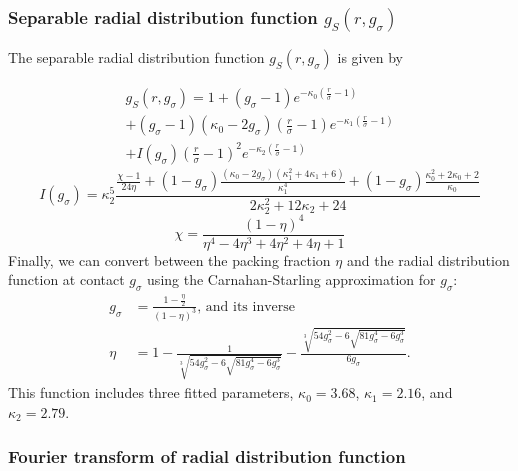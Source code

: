 \documentclass[letterpaper,twocolumn,amsmath,amssymb,pre,aps,10pt]{revtex4-1}
\begin{document}
\subsubsection{Separable radial distribution function
  $g_S(r,g_\sigma)$}

The separable radial distribution function $g_S(r,g_\sigma)$ is given
by
\newcommand\kappaO{\kappa_0}
\newcommand\kappaI{\kappa_1}
\newcommand\kappaZ{\kappa_2}
\newcommand\kappazero{3.68}
\newcommand\kappaone{2.16}
\newcommand\kappatwo{2.79}

\begin{multline}\label{eq:gs}
  g_S(r,g_\sigma) = 1 + (g_\sigma-1) e^{-\kappaO \left(\frac{r}{\sigma}-1\right)} \\
  + (g_\sigma -1)(\kappaO - 2g_\sigma)  \left(\frac{r}{\sigma}-1\right)e^{-\kappaI  \left(\frac{r}{\sigma}-1\right)} \\
  + I(g_\sigma)  \left(\frac{r}{\sigma}-1\right)^2e^{-\kappaZ  \left(\frac{r}{\sigma}-1\right)}
\end{multline}
\begin{equation}
  I(g_\sigma) = \kappaZ^5 \frac{
    \frac{\chi-1}{24\eta} + (1-g_\sigma) \frac{(\kappaO-2
      g_\sigma)(\kappaI^2 + 4 \kappaI + 6)}{\kappaI^4}
    + (1-g_\sigma)\frac{\kappaO^2 + 2\kappaO + 2}{\kappaO}
  }{2 \kappaZ^2 + 12 \kappaZ + 24}
\end{equation}
\begin{equation}
  \chi = \frac{(1-\eta)^4}{\eta^4 - 4\eta^3 + 4\eta^2 + 4\eta + 1}
\end{equation}
Finally, we can convert between the packing fraction $\eta$ and the
radial distribution function at contact $g_\sigma$ using the
Carnahan-Starling approximation for $g_\sigma$:
\newcommand\nastyetacuberoot{\sqrt[3]{54 g_\sigma^2 -
    6\sqrt{81g_\sigma^4 - 6g_\sigma^3}}}
\begin{align}
  g_\sigma &= \frac{1-\tfrac{\eta}{2}}{(1-\eta)^3}\text{, and its inverse} \\
  \eta &= 1 - \frac{1}{\nastyetacuberoot} - \frac{\nastyetacuberoot}{6g_\sigma}.
\end{align}
This function includes three fitted parameters, $\kappaO =
\kappazero$, $\kappaI = \kappaone$,
and $\kappaZ = \kappatwo$.

\subsubsection{Fourier transform of radial distribution function}
\end{document}
